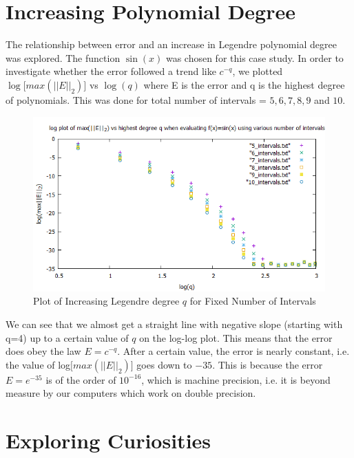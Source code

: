 \documentclass{article}
\begin{document}
\section{Increasing Polynomial Degree}
The relationship between error and an increase in Legendre polynomial degree was explored. The function $\sin(x)$ was chosen for this case study. In order to investigate whether the error followed a trend like $c^{-q}$, we plotted $\log\big[max(||E||_{2})\big]$ vs $\log(q)$ where E is the error and q is the highest degree of polynomials. This was done for total number of intervals = $5,6,7,8,9$ and $10$.
\begin{figure}[H]
  \centering
  \includegraphics[scale=0.5]{hw3.png}
  \caption{Plot of Increasing Legendre degree $q$ for Fixed Number of Intervals}
  \label{fig:incDegree}
\end{figure}
\noindent We can see that we almost get a straight line with negative slope (starting with q=4) up to a certain value of $q$ on the log-log plot. This means that the error does obey the law $E=c^{-q}$. After a certain value, the error is nearly constant, i.e. the value of log$\big[max(||E||_{2})\big]$ goes down to $-35$. This is because the error $E=e^{-35}$ is of the order of $10^{-16}$, which is machine precision, i.e. it is beyond measure by our computers which work on double precision.

\section{Exploring Curiosities}
\end{document}
